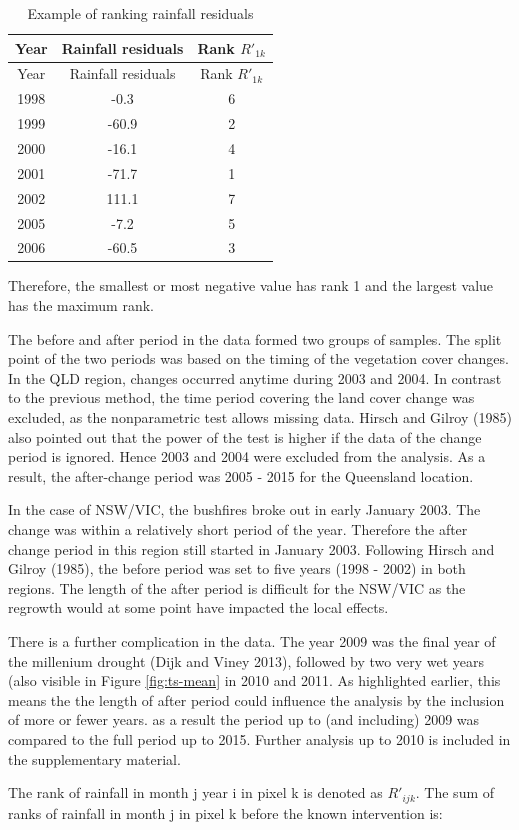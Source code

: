 \documentclass[]{elsarticle} %
\theoremstyle{definition}
\theoremstyle{definition}
\theoremstyle{definition}
\theoremstyle{remark}
\begin{document}
\begin{longtable}[]{@{}ccc@{}}
\caption{Example of ranking rainfall residuals}\tabularnewline
\toprule
Year & Rainfall residuals & Rank \(R'_{1k}\)\tabularnewline
\midrule
\endfirsthead
\toprule
Year & Rainfall residuals & Rank \(R'_{1k}\)\tabularnewline
\midrule
\endhead
1998 & -0.3 & 6\tabularnewline
1999 & -60.9 & 2\tabularnewline
2000 & -16.1 & 4\tabularnewline
2001 & -71.7 & 1\tabularnewline
2002 & 111.1 & 7\tabularnewline
2005 & -7.2 & 5\tabularnewline
2006 & -60.5 & 3\tabularnewline
\bottomrule
\end{longtable}

\noindent Therefore, the smallest or most negative value has rank 1 and
the largest value has the maximum rank.

The before and after period in the data formed two groups of samples.
The split point of the two periods was based on the timing of the
vegetation cover changes. In the QLD region, changes occurred anytime
during 2003 and 2004. In contrast to the previous method, the time
period covering the land cover change was excluded, as the nonparametric
test allows missing data. Hirsch and Gilroy (1985) also pointed out that
the power of the test is higher if the data of the change period is
ignored. Hence 2003 and 2004 were excluded from the analysis. As a
result, the after-change period was 2005 - 2015 for the Queensland
location.

In the case of NSW/VIC, the bushfires broke out in early January 2003.
The change was within a relatively short period of the year. Therefore
the after change period in this region still started in January 2003.
Following Hirsch and Gilroy (1985), the before period was set to five
years (1998 - 2002) in both regions. The length of the after period is
difficult for the NSW/VIC as the regrowth would at some point have
impacted the local effects.

There is a further complication in the data. The year 2009 was the final
year of the millenium drought (Dijk and Viney 2013), followed by two
very wet years (also visible in Figure \ref{fig:ts-mean} in 2010 and
2011. As highlighted earlier, this means the the length of after period
could influence the analysis by the inclusion of more or fewer years. as
a result the period up to (and including) 2009 was compared to the full
period up to 2015. Further analysis up to 2010 is included in the
supplementary material.

The rank of rainfall in month j year i in pixel k is denoted as
\(R'_{ijk}\). The sum of ranks of rainfall in month j in pixel k before
the known intervention is:
\end{document}
